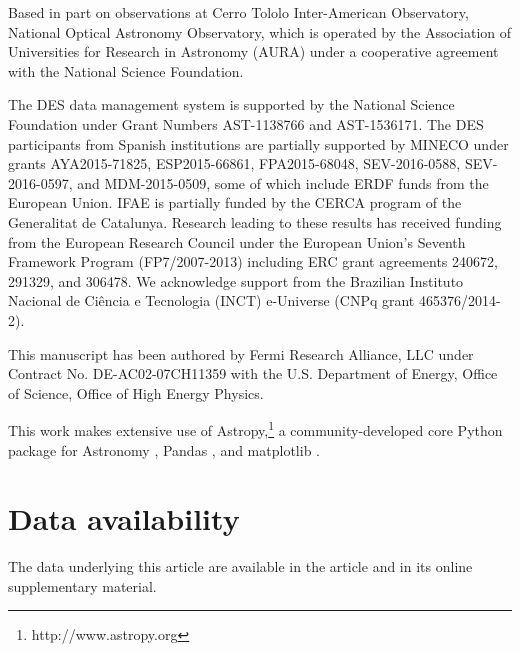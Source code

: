 \documentclass[fleqn,usenatbib,]{mnras}
\begin{document}
Based in part on observations at Cerro Tololo Inter-American Observatory, National Optical Astronomy Observatory, which is operated by the Association of 
Universities for Research in Astronomy (AURA) under a cooperative agreement with the National Science Foundation.

The DES data management system is supported by the National Science Foundation under Grant Numbers AST-1138766 and AST-1536171.
The DES participants from Spanish institutions are partially supported by MINECO under grants AYA2015-71825, ESP2015-66861, FPA2015-68048, SEV-2016-0588, SEV-2016-0597, and MDM-2015-0509, 
some of which include ERDF funds from the European Union. IFAE is partially funded by the CERCA program of the Generalitat de Catalunya.
Research leading to these results has received funding from the European Research
Council under the European Union's Seventh Framework Program (FP7/2007-2013) including ERC grant agreements 240672, 291329, and 306478.
We  acknowledge support from the Brazilian Instituto Nacional de Ci\^encia
e Tecnologia (INCT) e-Universe (CNPq grant 465376/2014-2).

This manuscript has been authored by Fermi Research Alliance, LLC under Contract No. DE-AC02-07CH11359 with the U.S. Department of Energy, Office of Science, Office of High Energy Physics.

This work makes extensive use of Astropy,\footnote{http://www.astropy.org} a community-developed core Python package for Astronomy \citep{AstropyCollaboration2013,AstropyCollaboration2018}, Pandas \citep{Mckinney2010}, and matplotlib \citep{Hunter2007}.

\section*{Data availability}
The data underlying this article are available in the article and in its online supplementary material.






\end{document}
